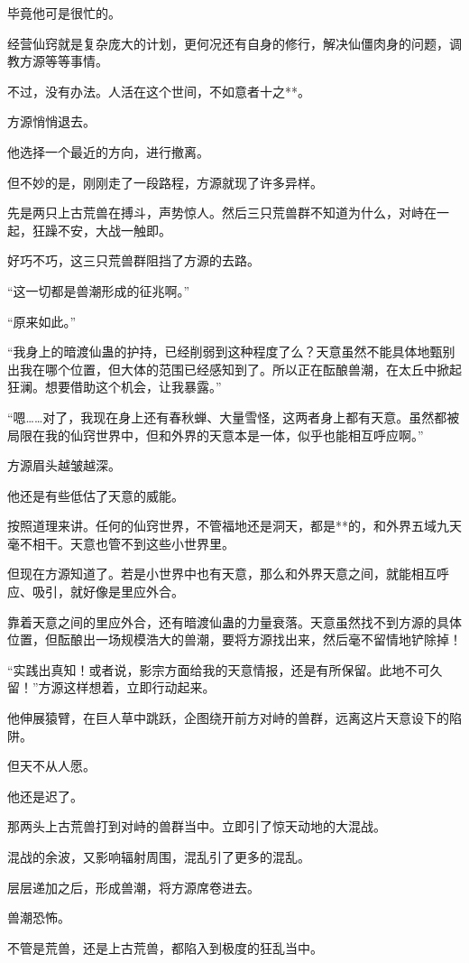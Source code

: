 \begin{this_body}
毕竟他可是很忙的。

经营仙窍就是复杂庞大的计划，更何况还有自身的修行，解决仙僵肉身的问题，调教方源等等事情。

不过，没有办法。人活在这个世间，不如意者十之**。

方源悄悄退去。

他选择一个最近的方向，进行撤离。

但不妙的是，刚刚走了一段路程，方源就现了许多异样。

先是两只上古荒兽在搏斗，声势惊人。然后三只荒兽群不知道为什么，对峙在一起，狂躁不安，大战一触即。

好巧不巧，这三只荒兽群阻挡了方源的去路。

“这一切都是兽潮形成的征兆啊。”

“原来如此。”

“我身上的暗渡仙蛊的护持，已经削弱到这种程度了么？天意虽然不能具体地甄别出我在哪个位置，但大体的范围已经感知到了。所以正在酝酿兽潮，在太丘中掀起狂澜。想要借助这个机会，让我暴露。”

“嗯……对了，我现在身上还有春秋蝉、大量雪怪，这两者身上都有天意。虽然都被局限在我的仙窍世界中，但和外界的天意本是一体，似乎也能相互呼应啊。”

方源眉头越皱越深。

他还是有些低估了天意的威能。

按照道理来讲。任何的仙窍世界，不管福地还是洞天，都是**的，和外界五域九天毫不相干。天意也管不到这些小世界里。

但现在方源知道了。若是小世界中也有天意，那么和外界天意之间，就能相互呼应、吸引，就好像是里应外合。

靠着天意之间的里应外合，还有暗渡仙蛊的力量衰落。天意虽然找不到方源的具体位置，但酝酿出一场规模浩大的兽潮，要将方源找出来，然后毫不留情地铲除掉！

“实践出真知！或者说，影宗方面给我的天意情报，还是有所保留。此地不可久留！”方源这样想着，立即行动起来。

他伸展猿臂，在巨人草中跳跃，企图绕开前方对峙的兽群，远离这片天意设下的陷阱。

但天不从人愿。

他还是迟了。

那两头上古荒兽打到对峙的兽群当中。立即引了惊天动地的大混战。

混战的余波，又影响辐射周围，混乱引了更多的混乱。

层层递加之后，形成兽潮，将方源席卷进去。

兽潮恐怖。

不管是荒兽，还是上古荒兽，都陷入到极度的狂乱当中。


\end{this_body}
